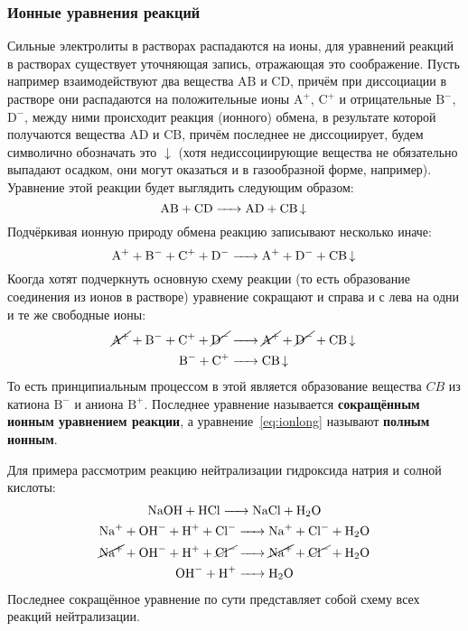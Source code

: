 \subsubsection{Ионные уравнения реакций}
Сильные электролиты в растворах распадаются на ионы, для уравнений реакций в растворах существует уточняющая запись, отражающая это соображение. Пусть например взаимодействуют два вещества $\mathrm{A}\mathrm{B}$ и $\mathrm{C}\mathrm{D}$, причём при диссоциации в растворе они распадаются на положительные ионы $\mathrm{A}^{+}$, $\mathrm{C}^{+}$ и отрицательные $\mathrm{B}^{-}$, $\mathrm{D}^{-}$, между ними происходит реакция (ионного) обмена, в результате которой получаются вещества $\mathrm{A}\mathrm{D}$ и $\mathrm{C}\mathrm{B}$, причём последнее не диссоциирует, будем символично обозначать это $\downarrow$ (хотя недиссоциирующие вещества не обязательно выпадают осадком, они могут оказаться и в газообразной форме, например). Уравнение этой реакции будет выглядить следующим образом:
\begin{equation*}
    \ce{AB + CD -> AD + CB v}
\end{equation*}
Подчёркивая ионную природу обмена реакцию записывают несколько иначе:
\begin{equation}
    \ce{A^{+} + B^{-} + C^{+} + D^{-} -> A^{+} + D^{-} + CB v}
\end{equation}
Коогда хотят подчеркнуть основную схему реакции (то есть образование соединения из ионов в растворе) уравнение сокращают и справа и с лева на  одни и те же свободные ионы:
\begin{gather}
	\label{eq:ionlong}
   \ce{\cancel{\ce{A^{+}}} + B^{-} + C^{+} + \cancel{\ce{D^{-}}} -> \cancel{\ce{A^{+}}} + \cancel{\ce{D^{-}}} + CB v} \\
   \ce{B^{-} + C^{+}  -> CB v} 
\end{gather}
То есть принципиальным процессом в этой является образование вещества $CB$ из катиона  $\mathrm{B}^{-}$ и аниона $\mathrm{B}^{+}$. Последнее уравнение называется \textbf{сокращённым ионным уравнением реакции}, а уравнение~\ref{eq:ionlong} называют \textbf{полным ионным}.

Для примера рассмотрим реакцию нейтрализации гидроксида натрия и солной кислоты:
\begin{gather*}
    \ce{NaOH + HCl -> NaCl + H2O}\\
    \ce{Na^{+} + OH^{-} + H^{+} + Cl^{-} -> Na^{+} + Cl^{-} + H2O}\\
    \ce{\cancel{\ce{Na^{+}}} + OH^{-} + H^{+} + \cancel{\ce{Cl^{-}}} -> \cancel{\ce{Na^{+}}} + \cancel{\ce{Cl^{-}}} + H2O}\\
    \ce{OH^{-} + H^{+} -> H2O}
\end{gather*}
Последнее сокращённое уравнение по сути представляет собой схему всех реакций нейтрализации. 
